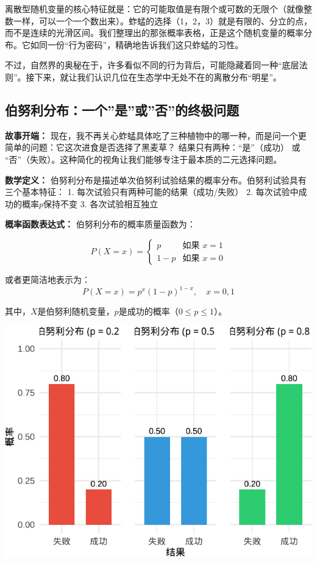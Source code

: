 \documentclass[
]{book}
\begin{document}
离散型随机变量的核心特征就是：它的可能取值是有限个或可数的无限个（就像整数一样，可以一个一个数出来）。蚱蜢的选择（1，2，3）就是有限的、分立的点，而不是连续的光滑区间。我们整理出的那张概率表格，正是这个随机变量的概率分布。它如同一份``行为密码''，精确地告诉我们这只蚱蜢的习性。

不过，自然界的奥秘在于，许多看似不同的行为背后，可能隐藏着同一种``底层法则''。接下来，就让我们认识几位在生态学中无处不在的离散分布``明星''。

\hypertarget{ux4f2fux52aaux5229ux5206ux5e03ux4e00ux4e2aux662fux6216ux5426ux7684ux7ec8ux6781ux95eeux9898}{%
\subsection{伯努利分布：一个''是''或''否''的终极问题}\label{ux4f2fux52aaux5229ux5206ux5e03ux4e00ux4e2aux662fux6216ux5426ux7684ux7ec8ux6781ux95eeux9898}}

\textbf{故事开端：} 现在，我不再关心蚱蜢具体吃了三种植物中的哪一种，而是问一个更简单的问题：它这次进食是否选择了黑麦草？ 结果只有两种：``是''（成功） 或 ``否''（失败）。这种简化的视角让我们能够专注于最本质的二元选择问题。

\textbf{数学定义：} 伯努利分布是描述单次伯努利试验结果的概率分布。伯努利试验具有三个基本特征：
1. 每次试验只有两种可能的结果（成功/失败）
2. 每次试验中成功的概率\(p\)保持不变
3. 各次试验相互独立

\textbf{概率函数表达式：} 伯努利分布的概率质量函数为：

\[P(X = x) = \begin{cases}
p & \text{如果 } x = 1 \\
1-p & \text{如果 } x = 0
\end{cases}\]

或者更简洁地表示为：
\[P(X = x) = p^x(1-p)^{1-x}, \quad x = 0,1\]

其中，\(X\)是伯努利随机变量，\(p\)是成功的概率（\(0 \leq p \leq 1\)）。

\begin{center}\includegraphics[width=0.8\linewidth]{ecological-statistics_files/figure-latex/unnamed-chunk-20-1} \end{center}
\end{document}
